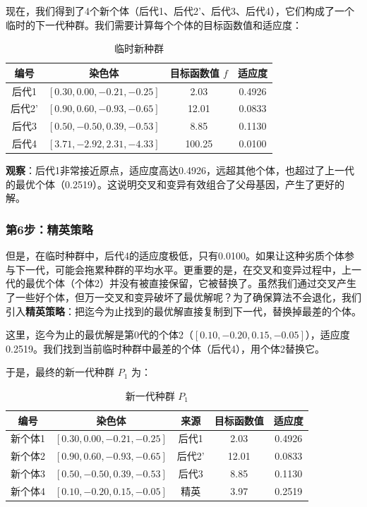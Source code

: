 \documentclass[lang=cn,zihao=-4,a4paper,fontset=windows]{beautybook}
\begin{document}
现在，我们得到了4个新个体（后代1、后代2'、后代3、后代4），它们构成了一个临时的下一代种群。我们需要计算每个个体的目标函数值和适应度：

\begin{table}[h]
\centering
\caption{临时新种群}
\begin{tabular}{|c|c|c|c|}
\hline
编号 & 染色体 & 目标函数值 $f$ & 适应度 \\
\hline
后代1 & $[0.30,0.00,-0.21,-0.25]$ & 2.03 & 0.4926 \\
后代2' & $[0.90,0.60,-0.93,-0.65]$ & 12.01 & 0.0833 \\
后代3 & $[0.50,-0.50,0.39,-0.53]$ & 8.85 & 0.1130 \\
后代4 & $[3.71,-2.92,2.31,-4.33]$ & 100.25 & 0.0100 \\
\hline
\end{tabular}
\end{table}

\textbf{观察}：后代1非常接近原点，适应度高达0.4926，远超其他个体，也超过了上一代的最优个体（0.2519）。这说明交叉和变异有效组合了父母基因，产生了更好的解。

\subsubsection{第6步：精英策略}

但是，在临时种群中，后代4的适应度极低，只有0.0100。如果让这种劣质个体参与下一代，可能会拖累种群的平均水平。更重要的是，在交叉和变异过程中，上一代的最优个体（个体2）并没有被直接保留，它被替换了。虽然我们通过交叉产生了一些好个体，但万一交叉和变异破坏了最优解呢？为了确保算法不会退化，我们引入\textbf{精英策略}：把迄今为止找到的最优解直接复制到下一代，替换掉最差的个体。

这里，迄今为止的最优解是第0代的个体2（$[0.10,-0.20,0.15,-0.05]$），适应度0.2519。我们找到当前临时种群中最差的个体（后代4），用个体2替换它。

于是，最终的新一代种群 $P_1$ 为：

\begin{table}[h]
\centering
\caption{新一代种群 $P_1$}
\begin{tabular}{|c|c|c|c|c|}
\hline
编号 & 染色体 & 来源 & 目标函数值 & 适应度 \\
\hline
新个体1 & $[0.30,0.00,-0.21,-0.25]$ & 后代1 & 2.03 & 0.4926 \\
新个体2 & $[0.90,0.60,-0.93,-0.65]$ & 后代2' & 12.01 & 0.0833 \\
新个体3 & $[0.50,-0.50,0.39,-0.53]$ & 后代3 & 8.85 & 0.1130 \\
新个体4 & $[0.10,-0.20,0.15,-0.05]$ & 精英 & 3.97 & 0.2519 \\
\hline
\end{tabular}
\end{table}
\end{document}
